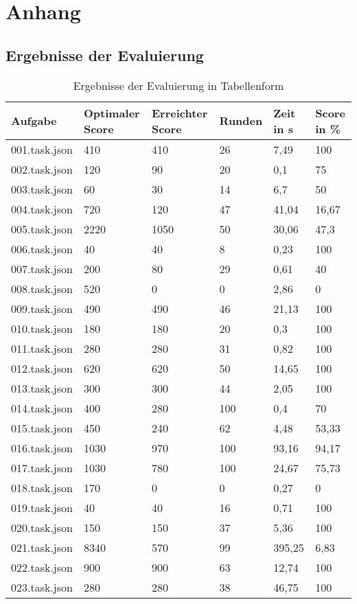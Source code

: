 \section{Anhang}

\subsection{Ergebnisse der Evaluierung}\label{cap:statistik}

\begin{table}[htp]
	\begin{center}
		\begin{tabular}{ | l | l | l | l | l | l |} 
\hline
\textbf{Aufgabe}&	\textbf{Optimaler Score}&	\textbf{Erreichter Score}&	\textbf{Runden}&	\textbf{Zeit in s}& \textbf{Score in \%}\\\hline		
001.task.json&	410&	410&	26&	7,49&		100\\\hline
002.task.json&	120&	90&	20&	0,1&		75\\\hline
003.task.json&	60&	30&	14&	6,7	&	50	\\\hline
004.task.json&	720&	120&	47&	41,04&		16,67\\\hline
005.task.json&	2220&	1050&	50&	30,06&		47,3\\\hline
006.task.json&	40&	40&	8&	0,23&		100\\\hline
007.task.json&	200&	80&	29&	0,61&		40\\\hline
008.task.json&	520&	0&	0&	2,86&		0\\\hline
009.task.json&	490&	490&	46&	21,13&		100\\\hline
010.task.json&	180&	180&	20&	0,3	&	100\\\hline
011.task.json&	280&	280&	31&	0,82&		100\\\hline
012.task.json&	620&	620&	50&	14,65&		100\\\hline
013.task.json&	300&	300&	44&	2,05&		100\\\hline
014.task.json&	400&	280&	100&	0,4&		70\\\hline
015.task.json&	450&	240&	62&	4,48&		53,33\\\hline
016.task.json&	1030&	970&	100&	93,16&		94,17\\\hline
017.task.json&	1030&	780&	100&	24,67&		75,73\\\hline
018.task.json&	170&	0&	0&	0,27&		0\\\hline
019.task.json&	40&	40&	16&	0,71&		100\\\hline
020.task.json&	150&	150&	37&	5,36&		100\\\hline
021.task.json&	8340&	570&	99&	395,25&		6,83\\\hline
022.task.json&	900&	900&	63&	12,74&		100\\\hline
023.task.json&	280&	280&	38&	46,75&		100\\\hline
\end{tabular}
\caption{Ergebnisse der Evaluierung in Tabellenform}
\end{center}
\end{table}


